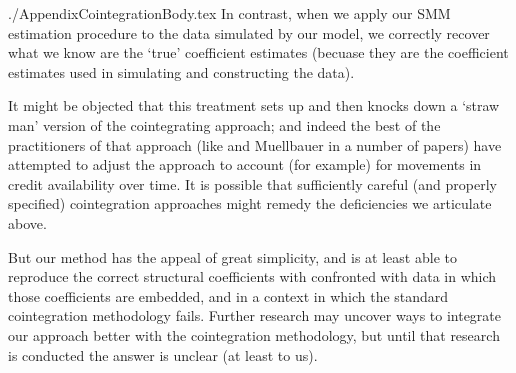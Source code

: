 \documentclass{\econtex}
\begin{document}
\begin{verbatimwrite}{./AppendixCointegrationBody.tex}
In contrast, when we apply our SMM estimation procedure to the data simulated by our model,
we correctly recover what we know are the `true' coefficient estimates (becuase they are the 
coefficient estimates used in simulating and constructing the data).  

It might be objected that this treatment sets up and then knocks down
a `straw man' version of the cointegrating approach; and indeed the
best of the practitioners of that approach (like
\cite{ducaEtAl10_creditArch} and Muellbauer in a number of papers)
have attempted to adjust the approach to account (for example) for
movements in credit availability over time.  It is possible that sufficiently
careful (and properly specified) cointegration approaches might remedy 
the deficiencies we articulate above.  

But our method has the appeal of great simplicity, and is at least able to 
reproduce the correct structural coefficients with confronted with data in 
which those coefficients are embedded, and in a context in which the standard
cointegration methodology fails.  Further research may uncover ways to integrate
our approach better with the cointegration methodology, but until that research
is conducted the answer is unclear (at least to us).  

\end{verbatimwrite}



%
\end{document}
